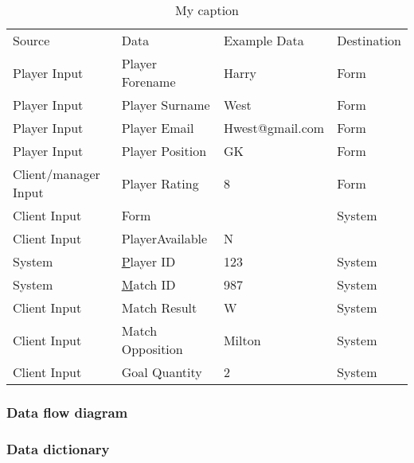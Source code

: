\begin{table}[]
\centering
\caption{My caption}
\label{my-label}
\begin{tabular}{llll}
Source               & Data             & Example Data    & Destination \\
Player Input         & Player Forename  & Harry           & Form        \\
Player Input         & Player Surname   & West            & Form        \\
Player Input         & Player Email     & Hwest@gmail.com & Form        \\
Player Input         & Player Position  & GK              & Form        \\
Client/manager Input & Player Rating    & 8               & Form        \\
Client Input         & Form             &                 & System      \\
Client Input         & PlayerAvailable    & N               &             \\
System               & {\ul Player ID}  & 123             & System      \\
System               & {\ul Match ID}   & 987             & System      \\
Client Input         & Match Result     & W               & System      \\
Client Input         & Match Opposition & Milton          & System      \\
Client Input         & Goal Quantity    & 2               & System     
\end{tabular}
\end{table}

\subsubsection{Data flow diagram}

\subsubsection{Data dictionary}

